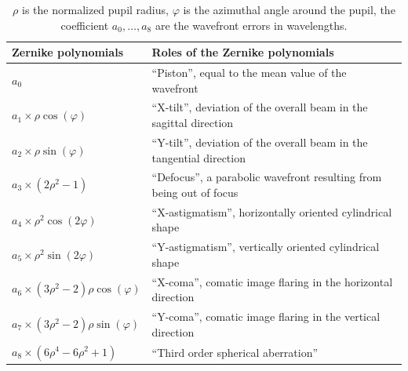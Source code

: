 \begin{table}
	\centering
	\begin{tabular*}{\textwidth}{p{}@{\extracolsep{\fill}}p{}}
\toprule
\toprule
Zernike polynomials & Roles of the Zernike polynomials \\ 
\midrule
$a_0$ & ``Piston'', equal to the mean value of the wavefront \\
$a_1\times\rho\cos(\varphi)$ & ``X-tilt'', deviation of the overall beam in the sagittal direction \\
$a_2\times\rho\sin(\varphi)$ & ``Y-tilt'', deviation of the overall beam in the tangential direction \\
$a_3\times(2\rho^2-1)$ & ``Defocus'', a parabolic wavefront resulting from being out of focus \\
$a_4\times\rho^2\cos(2\varphi)$ & ``X-astigmatism'', horizontally oriented cylindrical shape \\
$a_5\times\rho^2\sin(2\varphi)$ & ``Y-astigmatism'', vertically oriented cylindrical shape \\
$a_6\times(3\rho^2-2)\rho\cos(\varphi)$ & ``X-coma'', comatic image flaring in the horizontal direction \\
$a_7\times(3\rho^2-2)\rho\sin(\varphi)$ & ``Y-coma'', comatic image flaring in the vertical direction \\
$a_8\times(6\rho^4-6\rho^2+1)$ & ``Third order spherical aberration'' \\
\bottomrule
\bottomrule
\end{tabular*}
\caption
{$\rho$ is the normalized pupil radius, $\varphi$ is the azimuthal angle around the pupil,
the coefficient $a_0,\ldots,a_8$ are the wavefront errors in wavelengths.}
\label{tab:zernike-polynomials}
\end{table}

